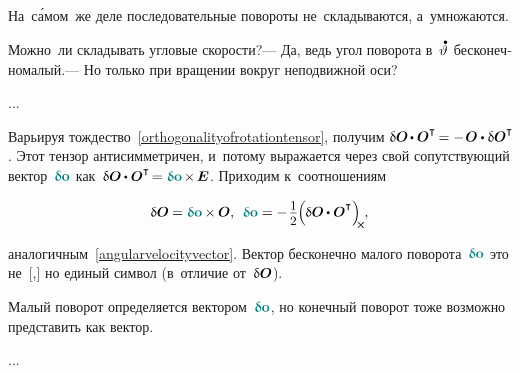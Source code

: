 \begin{otherlanguage}{russian}
На~с\'{а}мом~же деле последовательные повороты не~складываются, а~умножаются.

Можно~ли складывать угловые скорости?\:--- Да, ведь угол поворота в~$\mathdotabove{\vartheta}$ бесконечномалый.\:--- Но только при вращении вокруг неподвижной оси?


...



Варьируя тождество~\eqref{orthogonalityofrotationtensor},
получим ${\variation{\rotationtensor} \hspace{-0.2ex} \dotp \rotationtensor^{\T} \hspace{-0.2ex} = - \hspace{.2ex} \rotationtensor \dotp \variation{\rotationtensor}^{\T}\!}$.
Этот тензор антисимметричен, и~потому выражается через свой сопутствующий вектор~${\varvector{o}}$ как~${\variation{\rotationtensor} \hspace{-0.1ex} \dotp \rotationtensor^{\T} \hspace{-0.3ex} = \varvector{o} \hspace{-0.2ex} \times \hspace{-0.2ex} \UnitDyad}$.
Приходим к~соотношениям

\nopagebreak\vspace{-0.5em}\begin{equation}
\variation{\rotationtensor} \hspace{-0.1ex} = \varvector{o} \hspace{-0.1ex} \times \hspace{-0.1ex} \rotationtensor , \:\:
\varvector{o} = - \hspace{.2ex} \scalebox{.93}{$ \displaystyle\onehalf $} \hspace{-0.1ex} \Bigl( \hspace{-0.1ex} \variation{\rotationtensor} \hspace{-0.1ex} \dotp \rotationtensor^{\T} \Bigr)_{\hspace{-0.25em}\Xcompanion}
\hspace{-0.1ex} ,
\end{equation}

\vspace{-0.5em}\noindent

аналогичным~\eqref{angularvelocityvector}.
Вектор бесконечно малого поворота~${\varvector{o}}$
это не~[,]
но единый символ
(в~отличие от~${\updelta\hspace{-0.1ex}\bm{O}}$).


Малый поворот определяется вектором~${\varvector{o}}$,
но конечный поворот тоже возможно представить как вектор.


...


\end{otherlanguage}
